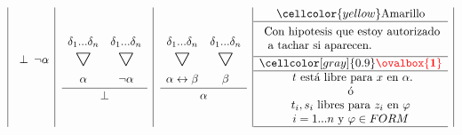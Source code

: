 \documentclass[a4paper, 10pt]{article}
\newcommand\triangulo{\scaleobj{1.6}{\bigtriangledown}}
\begin{document}
\begin{equation*}
\begin{array}{|c|c|c|c|c|}
\begin{matrix}
{\begin{matrix}
\begin{array}{c}
        \bot
      \end{array} \\
    \end{matrix}}{\neg \alpha}
  \\
  \ 
\end{matrix}
&
\begin{matrix}
  \cfrac{
    \begin{matrix}
      \begin{array}{cc}
      \ \\
        \delta_1 ... \delta_n & \delta_1 ... \delta_n \\
        \triangulo & \triangulo \vspace{2mm}\\
        \alpha & \neg \alpha
      \end{array} \\
    \end{matrix}}{\bot} \\
  \ 
\end{matrix}
&
\begin{matrix}
  \cfrac{
  \begin{matrix}
  \begin{array}{cc}
    \ \\
        \delta_1 ... \delta_n & \delta_1 ... \delta_n \\
        \triangulo & \triangulo \vspace{2mm}\\
        \alpha \leftrightarrow \beta & \beta
      \end{array} \\
    \end{matrix}}{\alpha} \\
  \ 
\end{matrix}
&
\hspace{-1ex}
\begin{array}{c}
\cellcolor{yellow} \text{Amarillo}  \\ \hline
\parbox[c][3em][c]{150px}{\text{Con hipotesis que estoy autorizado}\\ \text{ a tachar si aparecen.}} \\ \hline
\cellcolor[gray]{0.9}\textcolor{red}{\ovalbox{\textbf{1}}}\\ \hline 
\text{ $t$ está libre para $x$ en $\alpha$.} \\ $ó$ \\ \text{$t_i, s_i$ libres para $z_i$ en $\varphi$} \\ 
\text{$i = 1 ... n$ y $\varphi \in FORM$}
\\ \hline 

\end{array}
\end{array}
\end{equation*}
\end{document}
